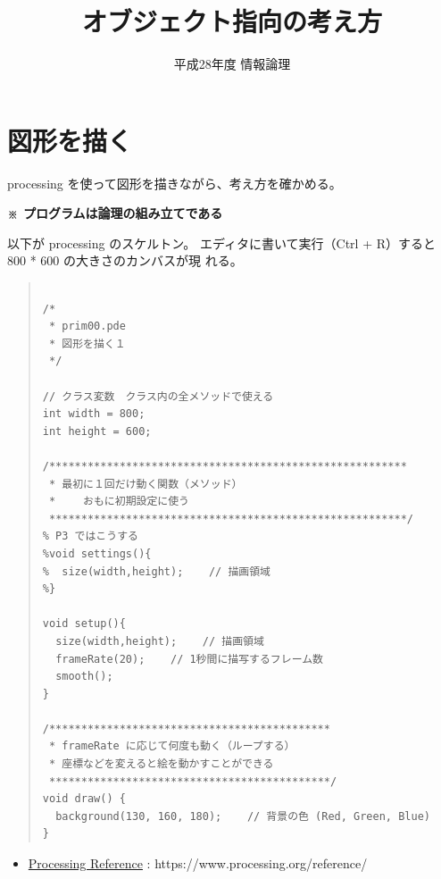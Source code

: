\documentclass[uplatex,a4j,11pt]{jsarticle}
\author{平成28年度 情報論理}
\title{オブジェクト指向の考え方}
\date{}
\renewcommand{\baselinestretch}{1.08}
\begin{document}
\maketitle
\pagestyle{plain}

\tableofcontents

\newpage
\def\baselinestretch{.9}\selectfont
\section{図形を描く}

processing を使って図形を描きながら、考え方を確かめる。

{\bfseries ※ プログラムは論理の組み立てである}

以下が processing のスケルトン。
エディタに書いて実行（Ctrl + R）すると 800 * 600 の大きさのカンバスが現
れる。

   \begin{quote}
	\begin{minipage}{\linewidth}
	 \begin{shadebox}
      \def\baselinestretch{.8}\selectfont
      \small
      \begin{verbatim}

/*
 * prim00.pde
 * 図形を描く１
 */

// クラス変数　クラス内の全メソッドで使える
int width = 800;
int height = 600;

/********************************************************
 * 最初に１回だけ動く関数（メソッド）
 * 　　おもに初期設定に使う
 ********************************************************/
% P3 ではこうする
%void settings(){
%  size(width,height);    // 描画領域
%}

void setup(){
  size(width,height);    // 描画領域
  frameRate(20);    // 1秒間に描写するフレーム数
  smooth();
}

/********************************************
 * frameRate に応じて何度も動く（ループする）
 * 座標などを変えると絵を動かすことができる
 ********************************************/
void draw() {
  background(130, 160, 180);    // 背景の色 (Red, Green, Blue)
}
      \end{verbatim}
	 \end{shadebox} 
	 \end{minipage}
	\end{quote}

\begin{itemize}
 \item 
       \href{https://www.processing.org/reference/}{Processing Reference}
       : https://www.processing.org/reference/
\end{itemize}
\end{document}
